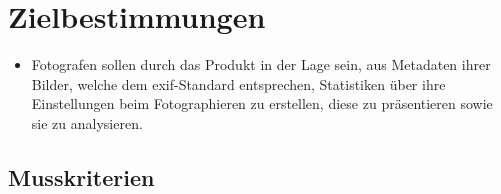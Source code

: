 \section{Zielbestimmungen}
\begin{itemize}
  \item Fotografen sollen durch das Produkt in der Lage sein, aus Metadaten ihrer Bilder, welche dem \gls{exif}-Standard entsprechen, Statistiken über ihre Einstellungen beim Fotographieren zu erstellen, diese zu präsentieren sowie sie zu analysieren.
  \end{itemize} 
\subsection{Musskriterien}

\label{subsec:musskriterien}

